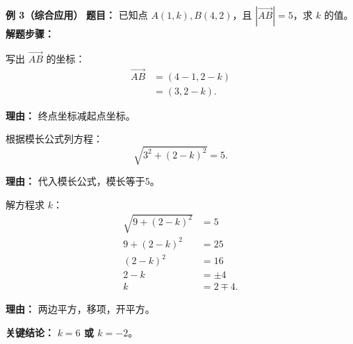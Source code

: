 \begin{examplebox}
	\medskip
	\textbf{\textcolor{CExample}{例 3（综合应用）}}
	\textbf{\textcolor{CExample}{题目：}}
	已知点 $A(1,k),B(4,2)$，且 $|\overrightarrow{AB}|=5$，求 $k$ 的值。
	\textbf{\textcolor{CExample}{解题步骤：}}
	\begin{description}[style=nextline, leftmargin=2.8em, labelsep=0.5em, itemsep=0.45em]
		\item[\textbf{第一步（坐标差向量）：}]
			写出 $\overrightarrow{AB}$ 的坐标：
			\[
				\begin{aligned}
					\overrightarrow{AB} &= (4-1,2-k) \\ &= (3,2-k).
			\end{aligned}
			\]
			\par\textbf{理由：} 终点坐标减起点坐标。
		\item[\textbf{第二步（列方程）：}]
			根据模长公式列方程：
			\[
				\sqrt{3^2 + (2-k)^2} = 5.
			\]
			\par\textbf{理由：} 代入模长公式，模长等于5。
		\item[\textbf{第三步（求解参数）：}]
			解方程求 $k$：
			\[
				\begin{aligned}
					\sqrt{9 + (2-k)^2} &= 5 \\ 9 + (2-k)^2 &= 25 \\ (2-k)^2 &= 16 \\ 2-k &= \pm 4 \\ k &= 2 \mp 4.
			\end{aligned}
			\]
			\par\textbf{理由：} 两边平方，移项，开平方。
	\end{description}
	\textbf{\textcolor{CExample}{关键结论：}}
	\textbf{$k=6$ 或 $k=-2$}。
\end{examplebox}
